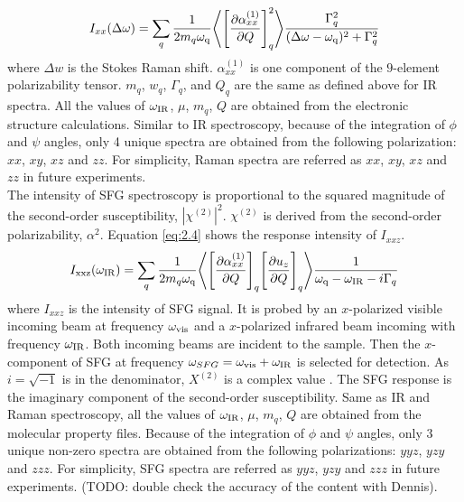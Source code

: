 \begin{equation} \label{eq:2.3}
I_{xx}(\Delta \omega) = \sum_{q} \frac{1}{2 m_{q} \omega_{\rm q}} \Bigg \langle \Bigg\lbrack \frac{\partial \alpha_{xx}^{(1)}}{\partial Q} \Bigg\rbrack_{q} ^2 \Bigg\rangle \frac{\Gamma_q^2}{(\Delta \omega-\omega_{\rm q})^2 + \Gamma_q^2}
\end{equation} 
where $\Delta w$ is the Stokes Raman shift. $\alpha_{xx}^{(1)}$ is one component of the $9$-element polarizability tensor. $m_q$, $w_q$, $\Gamma_q$, and $Q_q$ are the same as defined above for IR spectra. All the values of $\omega_{\rm IR}$, $\mu$, $m_q$, $Q$ are obtained from the electronic structure calculations. Similar to IR spectroscopy, because of the integration of $\phi$ and $\psi$ angles, only 4 unique spectra are obtained from the following polarization: $xx$, $xy$, $xz$ and $zz$. For simplicity, Raman spectra are referred as $xx$, $xy$, $xz$ and $zz$ in future experiments. \\

The intensity of SFG spectroscopy is proportional to the squared magnitude of the second-order susceptibility, $\left|\chi^{(2)}\right|^{2}$. $\chi^{(2)}$ is derived from the second-order polarizability, $\alpha^{2}$. Equation \ref{eq:2.4} shows the response intensity of $I_{xxz}$. \\
\begin{equation} \label{eq:2.4}
I_{\rm xxz}(\omega_{\rm IR}) = \sum_{q} \frac{1}{2 m_{q} \omega_{\rm q}} \Bigg \langle \Bigg\lbrack \frac{\partial \alpha_{xx}^{(1)}}{\partial Q} \Bigg\rbrack_{q} \Bigg\lbrack \frac{\partial u_{z}}{\partial Q} \Bigg\rbrack_{q} \Bigg\rangle \frac{1}{\omega_{\rm q}-\omega_{\rm IR}-i\Gamma_q}
\end{equation} 
where $I_{xxz}$ is the intensity of SFG signal. It is probed by an $x$-polarized visible incoming beam at frequency $\omega_{\rm vis}$ and a $x$-polarized infrared beam incoming with frequency $\omega_{\rm IR}$. Both incoming beams are incident to the sample. Then the $x$-component of SFG at frequency $\omega_{SFG}=\omega_{\rm vis}+\omega_{\rm IR}$ is selected for detection. As $i=\sqrt{-1}$ is in the denominator, $X^{(2)}$ is a complex value \cite{KuoKaiHung:Thesis:2015}. The SFG response is the imaginary component of the second-order susceptibility. Same as IR and Raman spectroscopy, all the values of $\omega_{\rm IR}$, $\mu$, $m_q$, $Q$ are obtained from the molecular property files. Because of the integration of $\phi$ and $\psi$ angles, only 3 unique non-zero spectra are obtained from the following polarizations: $yyz$, $yzy$ and $zzz$. For simplicity, SFG spectra are referred as $yyz$, $yzy$ and $zzz$ in future experiments.  (TODO: double check the accuracy of the content with Dennis). \\

